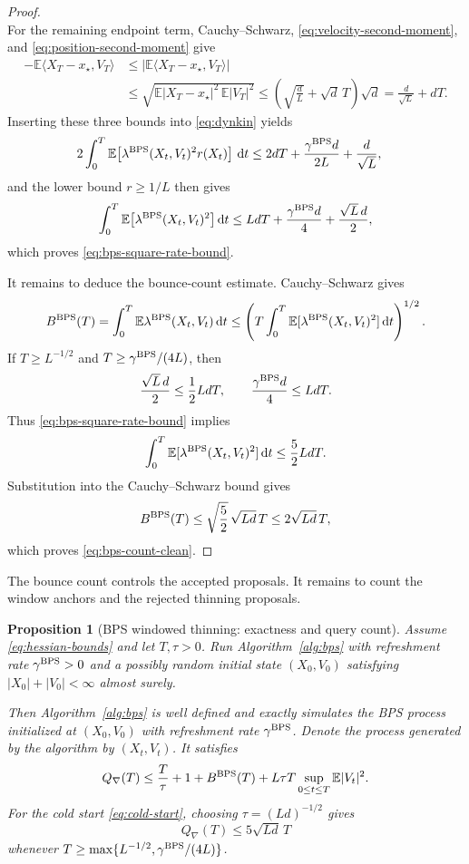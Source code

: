 \documentclass{amsart}
\theoremstyle{plain}
\newtheorem{prop}[theorem]{Proposition}
\theoremstyle{definition}
\theoremstyle{remark}
\newcommand{\ud}{\,\mathrm{d}}
\newcommand{\EE}{\mathbb{E}}
\newcommand{\abs}[1]{\lvert#1\rvert}
\newcommand{\E}{\EE}
\newcommand{\1}{\mathbf 1}
\newcommand{\dd}{\ud}
\newcommand{\ip}[2]{\langle #1,#2\rangle}
\newcommand{\bps}{{\rm BPS}}
\begin{document}
\begin{proof}
\[\]
For the remaining endpoint term, Cauchy--Schwarz,
\eqref{eq:velocity-second-moment}, and
\eqref{eq:position-second-moment} give
\[
\begin{aligned}
        -\E\ip{X_T-x_\star}{V_T}
        &\le
        \left|\E\ip{X_T-x_\star}{V_T}\right|\\
        &\le
        \sqrt{\E\abs{X_T-x_\star}^2\,\E\abs{V_T}^2}
        \le\left(\sqrt{\frac dL}+\sqrt d\,T\right)\sqrt d =\frac d{\sqrt L}+dT.
\end{aligned}
\]
Inserting these three bounds into \eqref{eq:dynkin} yields
\[
\begin{aligned}
        2\int_0^T\E\!\left[
          \lambda^{\bps}(X_t,V_t)^2r(X_t)
        \right]\dd t
        &\le 2dT+\frac{\gamma^{\bps}d}{2L}+\frac d{\sqrt L},
\end{aligned}
\]
and the lower bound $r\ge1/L$ then gives
\[
        \int_0^T
        \E\bigl[\lambda^{\bps}(X_t,V_t)^2\bigr]\dd t
        \le LdT+\frac{\gamma^{\bps}d}{4}+\frac{\sqrt L\,d}{2},
\]
which proves \eqref{eq:bps-square-rate-bound}.

It remains to deduce the bounce-count estimate. Cauchy--Schwarz gives
\[
        B^{\bps}(T)
        =\int_0^T\E\lambda^{\bps}(X_t,V_t)\dd t
        \le\left(
          T\int_0^T\E[\lambda^{\bps}(X_t,V_t)^2]\dd t
        \right)^{1/2}.
\]
If $T\ge L^{-1/2}$ and $T\ge\gamma^{\bps}/(4L)$, then
\[
        \frac{\sqrt L\,d}{2}\le\frac12LdT,
        \qquad
        \frac{\gamma^{\bps}d}{4}\le LdT.
\]
Thus \eqref{eq:bps-square-rate-bound} implies
\[
        \int_0^T\E[\lambda^{\bps}(X_t,V_t)^2]\dd t
        \le\frac52LdT.
\]
Substitution into the Cauchy--Schwarz bound gives
\[
        B^{\bps}(T)
        \le\sqrt{\frac52}\,\sqrt{Ld}\,T
        \le2\sqrt{Ld}\,T,
\]
which proves \eqref{eq:bps-count-clean}.
\end{proof}

The bounce count controls the accepted proposals.  It remains to count the
window anchors and the rejected thinning proposals.

\begin{prop}[BPS windowed thinning: exactness and query count]
\label{prop:bps-thinning}
Assume \eqref{eq:hessian-bounds} and let $T,\tau>0$.
Run Algorithm~\ref{alg:bps} with refreshment rate $\gamma^{\bps}>0$ and a
possibly random initial state $(X_0,V_0)$ satisfying
$\abs{X_0}+\abs{V_0}<\infty$ almost surely.

Then Algorithm~\ref{alg:bps} is well defined and exactly simulates the BPS
process initialized at $(X_0,V_0)$ with refreshment rate $\gamma^{\bps}$.
Denote the process generated by the algorithm by $(X_t,V_t)$. It satisfies
\begin{equation}\label{eq:bps-thinning-general}
Q_\nabla(T)
\le \frac{T}{\tau}+1+B^{\bps}(T)
+L\tau T\sup_{0\le t\le T}\E\abs{V_t}^2.
\end{equation}
For the cold start \eqref{eq:cold-start}, choosing
$\tau=(Ld)^{-1/2}$ gives
\begin{equation}\label{eq:bps-thinning-cold}
Q_\nabla(T)\le 5\sqrt{Ld}\,T
\end{equation}
whenever
$T\ge\max\{L^{-1/2},\gamma^{\bps}/(4L)\}$.
\end{prop}
\end{document}

